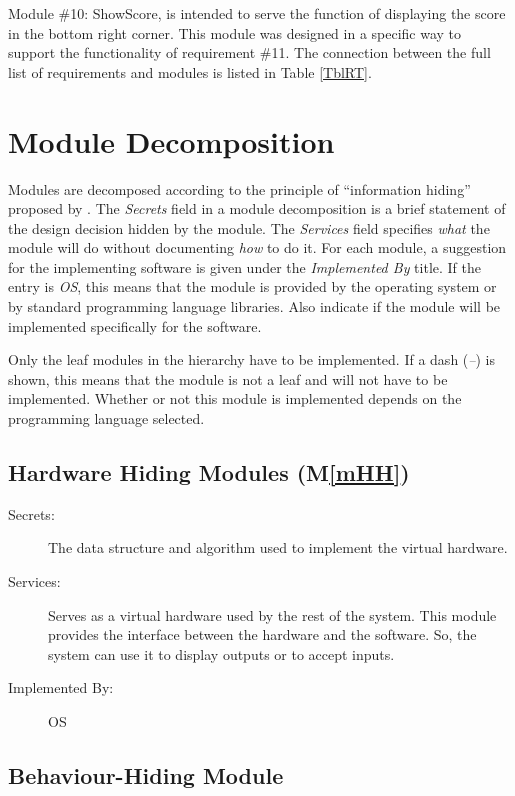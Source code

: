 \documentclass[12pt, titlepage]{article}
\newcommand{\mref}[1]{M\ref{#1}}
\begin{document}
Module \#10: ShowScore, is intended to serve the function of displaying the score in the bottom right corner. This module was designed in a specific way to support the functionality of requirement \#11. The connection between the full list of requirements and modules is listed in Table \ref{TblRT}.

\section{Module Decomposition} \label{SecMD}

Modules are decomposed according to the principle of ``information hiding''
proposed by \citet{ParnasEtAl1984}. The \emph{Secrets} field in a module
decomposition is a brief statement of the design decision hidden by the
module. The \emph{Services} field specifies \emph{what} the module will do
without documenting \emph{how} to do it. For each module, a suggestion for the
implementing software is given under the \emph{Implemented By} title. If the
entry is \emph{OS}, this means that the module is provided by the operating
system or by standard programming language libraries.  Also indicate if the
module will be implemented specifically for the software.

Only the leaf modules in the
hierarchy have to be implemented. If a dash (\emph{--}) is shown, this means
that the module is not a leaf and will not have to be implemented. Whether or
not this module is implemented depends on the programming language
selected.

\subsection{Hardware Hiding Modules (\mref{mHH})}

\begin{description}
\item[Secrets:]The data structure and algorithm used to implement the virtual
  hardware.
\item[Services:]Serves as a virtual hardware used by the rest of the
  system. This module provides the interface between the hardware and the
  software. So, the system can use it to display outputs or to accept inputs.
\item[Implemented By:] OS
\end{description}

\subsection{Behaviour-Hiding Module}
\end{document}
